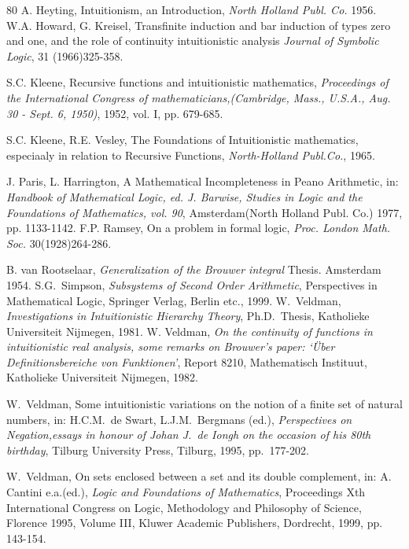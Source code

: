 \documentclass[a4paper]{amsart}
\theoremstyle{plain}
\begin{document}
\begin{thebibliography}{80}
   A. Heyting, Intuitionism, an Introduction, \textit{North Holland Publ. Co.} 1956.  W.A. Howard, G. Kreisel,
Transfinite induction and bar induction of types zero and one, and the role of continuity intuitionistic analysis
{\it Journal of Symbolic Logic}, 31 (1966)325-358.

 S.C. Kleene, Recursive functions and intuitionistic mathematics, \textit{Proceedings of the International Congress of mathematicians,(Cambridge, Mass., U.S.A., Aug. 30 - Sept. 6, 1950)}, 1952, vol. I, pp. 679-685.

 S.C. Kleene, R.E. Vesley, The Foundations of Intuitionistic mathematics, especiaaly in relation to Recursive Functions, \textit{North-Holland Publ.Co.}, 1965.

  J. Paris, L. Harrington, A Mathematical Incompleteness in Peano Arithmetic, in: \textit{Handbook of Mathematical Logic, ed. J. Barwise, Studies in Logic and the Foundations of Mathematics, vol. 90}, Amsterdam(North Holland Publ. Co.) 1977, pp. 1133-1142.
  F.P. Ramsey, On a problem in formal logic, \textit{Proc. London Math. Soc.} 30(1928)264-286. 
 
  B. van Rootselaar, {\it Generalization of the Brouwer integral} Thesis. Amsterdam 1954.
 S.G.~Simpson, \textit{Subsystems of Second Order Arithmetic},
 Perspectives in Mathematical Logic,  Springer Verlag, Berlin etc., 1999.
 W.~Veldman,  {\it Investigations in Intuitionistic Hierarchy
Theory}, Ph.D.~Thesis, Katholieke Universiteit Nijmegen, 1981. 
 W. Veldman, \textit{On the continuity of functions in intuitionistic real analysis, some remarks on Brouwer's paper: `\"Uber Definitionsbereiche von Funktionen'}, Report 8210, Mathematisch Instituut, Katholieke Universiteit Nijmegen, 1982.  



W.~Veldman,  Some intuitionistic variations on the notion of a
finite set of natural numbers, in: H.C.M.~de Swart, L.J.M.~Bergmans
(ed.), {\it Perspectives on Negation,essays in honour of Johan J.~de
Iongh on the occasion of his 80th birthday}, Tilburg University
Press, Tilburg, 1995, pp.~177-202.

W.~Veldman,  On sets enclosed between a set and its double
complement, in: A. Cantini e.a.(ed.), {\em Logic and Foundations of 
Mathematics}, Proceedings Xth International Congress on Logic,
Methodology and Philosophy of Science, Florence 1995, Volume III, Kluwer
Academic Publishers, Dordrecht, 1999, pp. 143-154.


\end{thebibliography}
\end{document}

